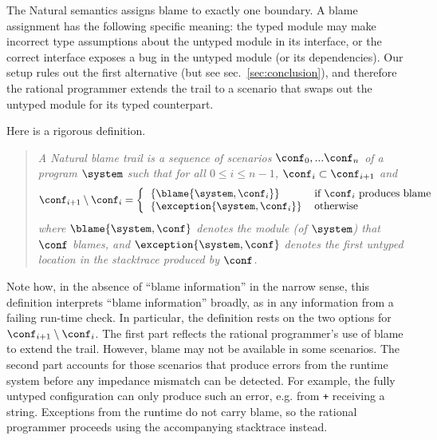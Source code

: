 
The Natural semantics assigns blame to exactly one boundary.  A blame assignment
has the following specific meaning: the typed module may make incorrect type
assumptions about the untyped module in its interface, or the correct
interface exposes a bug in the untyped module (or its dependencies). Our setup rules out the first
alternative (but see sec.~\ref{sec:conclusion}), and therefore the rational
programmer extends the trail to a scenario that swaps out the untyped
module for its typed counterpart.



Here is a rigorous definition. 
\begin{quote}
\it A \emph{Natural blame trail} is a sequence of scenarios $\conf_0,...\conf_n$ of
a program $\system$ such that for all $0 \leq i \leq n - 1$, $\conf_i \subset
\conf_{i+1}$ and
\[ \conf_{i+1} \setminus \conf_i = %
\left\{ %
\begin{tabular}{ll} %
$\{\blame{\system, \conf_i}\}$      & if $\conf_i$ produces blame \\ %
$\{\exception{\system, \conf_i}\}$  & otherwise \\ %
\end{tabular} \right. %
\]
where $\blame{\system, \conf}$ denotes the module (of $\system$) that $\conf$ blames,
and $\exception{\system, \conf}$ denotes the first untyped location in the stacktrace produced by $\conf$.
\end{quote}
Note how, in the absence of ``blame information'' in the narrow sense, 
this definition interprets ``blame information'' broadly, as in
any information from a failing run-time check.  
In particular, the definition rests on the two options for $\conf_{i+1} \setminus \conf_i$.
The first part reflects the rational programmer's use of blame to extend the
trail. However, blame may not be available in some scenarios. The second part
accounts for those scenarios that produce errors from the runtime system before
any impedance mismatch can be detected. For example, the fully untyped
configuration can only produce such an error, e.g. from {\tt +} receiving a
string. Exceptions from the runtime do not carry blame, so
the rational programmer proceeds using the accompanying stacktrace instead.

